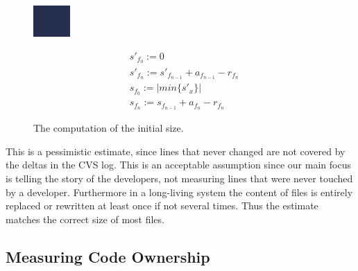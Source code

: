 \documentclass[10pt]{book}
\begin{document}
\begin{figure}[htbp]
\begin{minipage}[c]{.45\linewidth}
\includegraphics[width=1.2\linewidth]{minimum}
 \end{minipage}
 \hfill
 \begin{minipage}[c]{.5\linewidth}
\begin{eqnarray}
& s'_{f_0} := 0 \nonumber \\
& s'_{f_n} := s'_{f_{n-1}} + a_{f_{n-1}} - r_{f_n} \nonumber  \\
& s_{f_0} := \vert min \{ s'_x \} \vert \nonumber \\
& s_{f_n} := s_{f_{n-1}} + a_{f_n} - r_{f_n} \nonumber
 \end{eqnarray}
 \end{minipage}
\caption{The computation of the initial size.}
\label{fig:filesize}
\end{figure}

This is a pessimistic estimate, since lines that never changed are not covered by the deltas in the CVS log. This is an acceptable assumption since our main focus is telling the story of the developers, not measuring lines that were never touched by a developer. Furthermore in a long-living system the content of files is entirely replaced or rewritten at least once if not several times. Thus the estimate matches the correct size of most files.

\subsection{Measuring Code Ownership}
\end{document}
